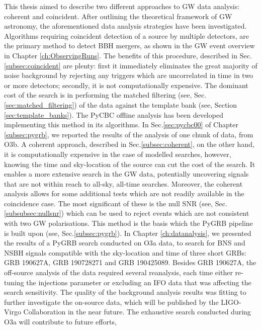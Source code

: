 \documentclass[binding=0.6cm, LaM]{sapthesis}
\begin{document}
This thesis aimed to describe two different approaches to GW data analysis: coherent and coincident.
	After outlining the theoretical framework of GW astronomy,
	the aforementioned data analysis strategies have been investigated. 
	Algorithms requiring coincident detection of a source by multiple detectors,
	are the primary method to detect BBH mergers, 
	as shown in the GW event overview in Chapter \ref{ch:ObservingRuns}.
	The benefits of this procedure, described in Sec.\ref{subsec:coincident} are plenty: 
	first it immediately eliminates the great majority of noise background 
	by rejecting any triggers which are uncorrelated in time in two or more detectors; 
	secondly, it is not computationally expensive. 
	The dominant cost of the search is in performing the matched filtering (see, Sec.\ref{sec:matched_filtering}) 
	of the data against the template bank (see, Section \ref{sec:template_banks}).
	The {\ttfamily PyCBC} offline analysis has been developed implementing this method in its algorithms. 
	In Sec.\ref{sec:pycbc00} of Chapter \ref{subsec:pygrb}, we reported the results of the analysis of one chunk of data,  from O3b.
	A coherent approach, described in Sec.\ref{subsec:coherent}, on the other hand, 
	it is computationally expensive in the case of modelled searches,
	however, knowing the time and sky-location of the source can cut the cost of the search.
	It enables a more extensive search in the GW data, potentially uncovering signals 
	that are not within reach to all-sky, all-time searches.
	Moreover, the coherent analysis allows for some additional tests 
	which are not readily available in the coincidence case. 
	The most significant of these is the null SNR (see, Sec.\ref{subsubsec:nullsnr}) which can be used to reject events which are 
	not consistent with two GW polarisations. 
	This method is the  basis which the  {\ttfamily PyGRB}  pipeline is built upon (see, Sec.\ref{subsec:pygrb}).
	In Chapter \ref{ch:datanalysis}, we presented the results of a {\ttfamily PyGRB} search conducted on O3a data,
	to search for BNS and NSBH signals compatible with the sky-location and time of three short GRBs:
	GRB 190627A, GRB 190728271 and GRB 190425089.
	Besides GRB 190627A, the off-source analysis of the data required several reanalysis,
	each time either re-tuning the injections parameter or excluding an IFO data that was affecting the search sensitivity.
	The quality of the background analysis results was fitting to further investigate
	the on-source data, which will be published by the LIGO-Virgo Collaboration in the near future.
	The exhaustive search conducted during O3a will contribute to future  efforts,
\end{document}
